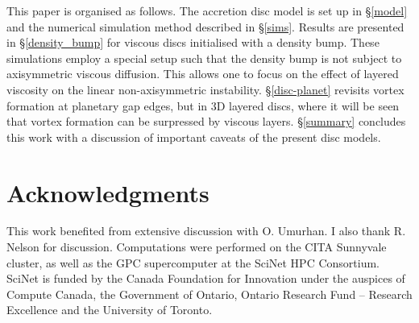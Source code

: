 \documentclass[useAMS,usenatbib]{mn2e}
\begin{document}
 
This paper is organised as follows. The accretion disc model is 
set up in \S\ref{model} and the numerical simulation method described
in \S\ref{sims}. Results are presented in \S\ref{density_bump} for 
viscous discs initialised with a density bump. These 
simulations employ a special setup such that the density bump is not
subject to axisymmetric viscous diffusion. This allows one to
focus on the effect of layered viscosity on the linear
non-axisymmetric instability. \S\ref{disc-planet} revisits vortex
formation at planetary gap edges, but in 3D layered discs, 
where it will be seen that vortex formation can be surpressed by
viscous layers. \S\ref{summary} concludes this work with a discussion
of important caveats of the present disc models.   







\section*{Acknowledgments}
This work benefited from extensive discussion with O. Umurhan. I also
thank R. Nelson for discussion. Computations were performed on the
CITA Sunnyvale cluster, as well as the GPC supercomputer at the SciNet
HPC Consortium. SciNet is funded by the Canada Foundation for
Innovation under the auspices of Compute Canada, the Government of
Ontario, Ontario Research Fund – Research Excellence and the
University of Toronto.   




%
%
\end{document}
